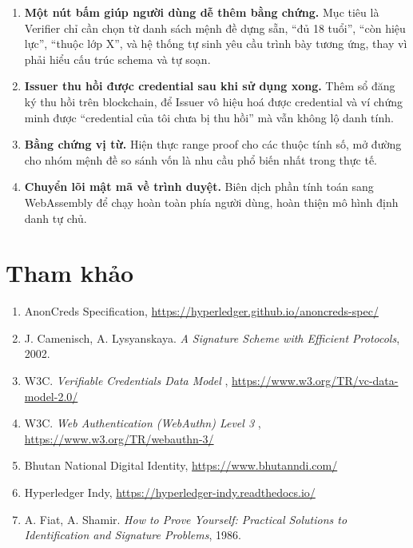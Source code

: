 \documentclass[a4paper,11pt,oneside]{report}
\theoremstyle{definition}
\theoremstyle{plain}
\begin{document}
\begin{enumerate}[leftmargin=1.6em,itemsep=8pt]
  \item \textbf{Một nút bấm giúp người dùng dễ thêm bằng chứng.}
    Mục tiêu là Verifier chỉ cần chọn từ danh sách mệnh đề dựng sẵn, ``đủ 18
    tuổi'', ``còn hiệu lực'', ``thuộc lớp X'', và hệ thống tự sinh
    yêu cầu trình bày tương ứng, thay vì phải hiểu cấu trúc schema và tự
    soạn.

  \item \textbf{Issuer thu hồi được credential sau khi sử dụng xong.}
    Thêm sổ đăng ký thu hồi trên blockchain, để Issuer vô hiệu
    hoá được credential và ví chứng minh được ``credential của tôi chưa bị thu
    hồi'' mà vẫn không lộ danh tính.

  \item \textbf{Bằng chứng vị từ.}
    Hiện thực range proof cho các thuộc tính số, mở đường cho nhóm mệnh đề so sánh vốn là nhu cầu
    phổ biến nhất trong thực tế.

  \item \textbf{Chuyển lõi mật mã về trình duyệt.}
    Biên dịch phần tính toán sang WebAssembly để chạy hoàn toàn phía người dùng, hoàn thiện mô
    hình định danh tự chủ.
\end{enumerate}

\chapter*{Tham khảo}

\begin{enumerate}[leftmargin=1.6em,itemsep=5pt]
  \item AnonCreds Specification, \url{https://hyperledger.github.io/anoncreds-spec/}
  \item J. Camenisch, A. Lysyanskaya. \emph{A Signature Scheme with Efficient Protocols}, 2002.
  \item W3C. \emph{Verifiable Credentials Data Model} , 
        \url{https://www.w3.org/TR/vc-data-model-2.0/}
  \item W3C. \emph{Web Authentication (WebAuthn) Level 3} , 
        \url{https://www.w3.org/TR/webauthn-3/}
  \item Bhutan National Digital Identity, \url{https://www.bhutanndi.com/}
  \item Hyperledger Indy, \url{https://hyperledger-indy.readthedocs.io/}
  \item A. Fiat, A. Shamir. \emph{How to Prove Yourself: Practical Solutions to Identification and
        Signature Problems}, 1986.
\end{enumerate}
\end{document}

